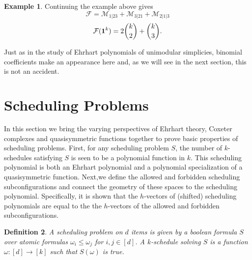 \documentclass[12pt,reqno]{amsart}
\newtheorem{definition}{Definition}
\numberwithin{definition}{section}
\newtheorem{lemma}[definition]{Lemma}
\theoremstyle{definition}
\newtheorem{example}[definition]{Example}
\newcommand{\SSS}{\mathcal{S}}
\newcommand{\defn}[1]{\emph{#1}}
\newcommand{\ncM}{\mathcal{M}}
\newcommand{\poly}{\chi} %
\newcommand{\comment}[1]{\textsf{\footnotesize #1}}
\begin{document}
\begin{example}
 Continuing the example above gives
$$\mathcal{F} = \ncM_{1|23} + \ncM_{3|21} + \ncM_{2|1|3}$$
$$ \mathcal{F}({\bf 1}^k) = 2 {k \choose 2} + {k \choose 3}.$$  
\end{example}

Just as in the study of Ehrhart polynomials of unimodular simplicies, binomial coefficients make an appearance here and, as we will see in the next section, this is not an accident.






\section{Scheduling Problems}
\label{sec:scheduling-problems}

In this section we bring the varying perspectives of Ehrhart theory, Coxeter complexes and quasisymmetric functions together to prove basic properties of scheduling problems.  First, for any scheduling problem $S$, the number of $k$-schedules satisfying $S$ is seen to be a polynomial function in $k$.  This scheduling polynomial is both an Ehrhart polynomial and a polynomial specialization of a quasisymmetric function.  Next,we define the allowed and forbidden scheduling subconfigurations and connect the geometry of these spaces to the scheduling polynomial.  Specifically, it is shown that the $h$-vectors of (shifted) scheduling polynomials are equal to the the $h$-vectors of the allowed and forbidden subconfigurations.  


\begin{definition}
A \defn{scheduling problem} on $d$ items is given by a boolean
formula $S$ over atomic formulas $\omega_i\leq \omega_j$ for
$i,j\in[d]$. A \defn{$k$-schedule} solving $S$ is a function
$\omega:[d]\rightarrow[k]$ such that $S(\omega)$ is true.
\end{definition}
\end{document}
